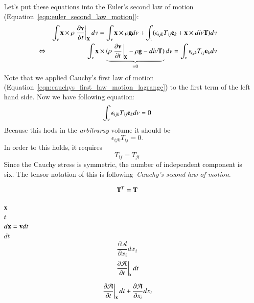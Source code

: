 Let's put these equations into the Euler's second law of motion (Equation~\eqref{eqn:euler_second_law_motion}):
%
\begin{eqnarray}
&&
\int_v {\mathbf{x}} \times \rho \left.\frac{\partial\mathbf{v}}{\partial{t}}\right|_{\mathbf{X}}  dv 
=\int_v {\mathbf{x}} \times \rho {\mathbf{g}} dv + \int_v ({\epsilon_{ijk}}T_{ij}{\mathbf{e}_k} + {\mathbf{x}} \times div{\mathbf{T}} ) dv \\
&\Leftrightarrow&
 \int_v {\mathbf{x}} \times \underbrace{( \rho \left.\frac{\partial\mathbf{v}}{\partial{t}}\right|_{\mathbf{X}} - \rho {\mathbf{g}} - div{\mathbf{T}} )}_{=0} dv 
=\int_v {\epsilon_{ijk}}T_{ij}{\mathbf{e}_k} dv 
\end{eqnarray}
%
Note that we applied Cauchy's first law of motion (Equation~\eqref{eqn:cauchys_first_law_motion_lagrange}) to the first term of the left hand side. 
Now we have following equation:
%
\begin{equation}
\int_v {\epsilon_{ijk}}T_{ij}{\mathbf{e}_k} dv = 0 
\end{equation}
Because this hods in the \emph{arbitraray} volume it should be
\begin{equation}
{\epsilon_{ijk}}T_{ij}=0.
\end{equation}
In order to this holds, it requires
\begin{equation}
T_{ij} = T_{ji}
\end{equation}
Since the Cauchy stress is symmetric, the number of independent component is six.
%
The tensor notation of this is following~\emph{Cauchy's second law of motion}.
%
\begin{tcolorbox}[title=Cauchy's second law of motion]
\begin{eqnarray}
{\mathbf{T}^T} = {\mathbf{T}}
\end{eqnarray}
\end{tcolorbox}


$\mathbf{x}$\\
$t$\\
$d\mathbf{x} = \mathbf{v}dt$\\
$dt$\\
\begin{equation}
\frac{\partial\mathcal{A}}{\partial{x_i}}dx_i
\end{equation}
\begin{equation}
\left.\frac{\partial\mathcal{A}}{\partial{t}}\right|_{\mathbf{x}} dt
\end{equation}

\begin{equation}
\left.\frac{\partial\mathcal{A}}{\partial{t}}\right|_{\mathbf{x}} dt 
+
\frac{\partial\mathcal{A}}{\partial{x_i}}dx_i
\end{equation}

